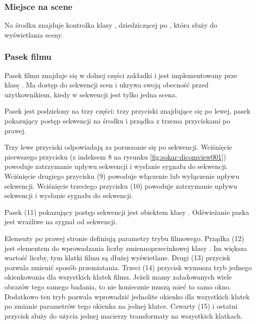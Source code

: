 \subsubsection{Miejsce na scene}
\label{sec:sokar-dicomgraphics}
\par
Na środku znajduje kontrolka klasy , dziedziczącej po , która służy do wyświetlania sceny.

\subsubsection{Pasek filmu}
\label{sec:sokar-moviebar}

\par
Pasek filmu znajduje się w dolnej części zakładki i jest implementowany prze klasę .
Ma dostęp do sekwencji scen i ukrywa swoją obecność przed użytkownikiem, kiedy w sekwencji jest tylko jedna scena.

\par
Pasek jest podzielony na trzy części: trzy przyciski znajdujące się po lewej, pasek pokazujący postęp sekwencji na środku i prządka z trzema przyciskami po prawej.

\par
Trzy lewe przyciski odpowiadają za poruszanie się po sekwencji.
Wciśnięcie pierwszego przycisku (z indeksem 8 na rysunku \ref{fig:sokar-dicomview001}) powoduje zatrzymanie upływu sekwencji i wysłanie sygnału  do sekwencji.
Wciśnięcie drugiego przycisku (9) powoduje włączenie lub wyłączenie upływu sekwencji.
Wciśnięcie trzeciego przycisku (10) powoduje zatrzymanie upływu sekwencji i wysłanie sygnału  do sekwencji.
\par
Pasek (11) pokazujący postęp sekwencji jest obiektem klasy .
Odświeżanie paska jest wrażliwe na sygnał  od sekwencji.
\par
Elementy po prawej stronie definiują parametry trybu filmowego.
Prządka (12) jest elementem do wprowadzania liczby zmiennoprzecinkowej klasy .
Im większa wartość liczby, tym klatki filmu są dłużej wyświetlane.
Drugi (13) przycisk pozwala zmienić sposób przemiatania.
Trzeci (14) przycisk wymusza tryb jednego okienkowania dla wszystkich klatek filmu.
Jeżeli mamy załadowanych wiele obrazów tego samego badania, to nie koniecznie muszą mieć to samo okno.
Dodatkowo ten tryb pozwala wprowadzić jednolite okienko dla wszystkich klatek po zmianie parametrów tego okienka na jednej klatce.
Czwarty (15) i ostatni przycisk służy do użycia jednej macierzy transformaty na wszystkich klatkach.

